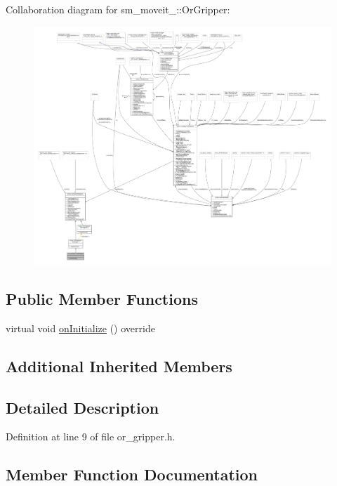 Collaboration diagram for sm\+\_\+moveit\+\_\+:\+:Or\+Gripper\+:
\nopagebreak
\begin{figure}[H]
\begin{center}
\leavevmode
\includegraphics[width=350pt]{classsm__moveit__4_1_1OrGripper__coll__graph}
\end{center}
\end{figure}
\subsection*{Public Member Functions}
\begin{DoxyCompactItemize}
\item 
virtual void \hyperlink{classsm__moveit__4_1_1OrGripper_af302e900393a39ceef67cf8d832dc076}{on\+Initialize} () override
\end{DoxyCompactItemize}
\subsection*{Additional Inherited Members}


\subsection{Detailed Description}


Definition at line 9 of file or\+\_\+gripper.\+h.



\subsection{Member Function Documentation}
\mbox{\label{classsm__moveit__4_1_1OrGripper_af302e900393a39ceef67cf8d832dc076}} 

